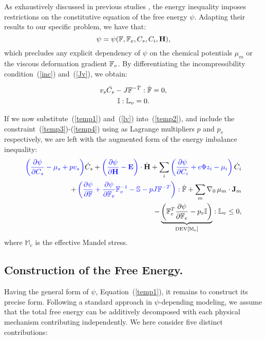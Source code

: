 As exhaustively discussed in previous studies \cite{Plasto,GURTIN}, the energy inequality imposes restrictions on the constitutive equation of the free energy $\psi$. Adapting their results to our specific problem, we have that:
\begin{equation}
\psi = \psi (\mathbb{F},\mathbb{F}_e, C_s, C_i, \mathbf{H}), \label{temp1}
\end{equation}
which precludes any explicit dependency of $\psi$ on the chemical potentials $\mu_m$ or the viscous deformation gradient $\mathbb{F}_v$. By differentiating the incompressibility condition~(\ref{inc}) and~(\ref{Jv}), we obtain:

\begin{gather}
v_s\dot{C_s} - J \mathbb{F}^{-T}:\dot{\mathbb{F}} =0, \label{temp3}\\
\mathbb{I}:\mathbb{L}_v=0. \label{temp4}
\end{gather}

If we now substitute~(\ref{temp1}) and~(\ref{lv}) into~(\ref{temp2}), and include the constraint~(\ref{temp3})-(\ref{temp4}) using as Lagrange multipliers $p$ and $p_v$ respectively, we are left with the augmented form of the energy imbalance inequality:
\begin{equation}
\begin{aligned}
 \color{blue}{\left(\frac{\partial \psi}{\partial C_s}-\mu_s+p v_s\right)}\color{black}\dot{C}_s+\color{blue}\left(\frac{\partial \psi}{\partial \mathbf{H}}-\mathbf{E}\right) \cdot \color{black}\dot{\mathbf{H}}+ \sum_i\color{blue}\left(\frac{\partial \psi}{\partial C_i} + e\Phi z_i-\mu_i\right) \color{black}\dot{C}_i \\
+ \color{blue} \left(\frac{\partial \psi}{\partial \mathbb{F}} + \frac{\partial \psi}{\partial\mathbb{F}_e}\mathbb{F}_v^{-1}- \mathbb{S} - p J \mathbb{F}^{-T}\right): \color{black}\dot{\mathbb{F}}+ \sum_m \nabla_0 \,\mu_m \cdot \mathbf{J}_m \\
- \underbrace{\left(\mathbb{F}_e^T\frac{\partial \psi}{\partial \mathbb{F}_e}-p_v\mathbb{I}\right)}_{\text{DEV}[\mathbb{M}_e]}:\mathbb{L}_v\leq 0 , \label{ineq}
\end{aligned}
\end{equation}
where $\mathbb{M}_e$ is the effective Mandel stress. 
\subsection{Construction of the Free Energy.}
\label{freeenergy}
Having the general form of $\psi$, Equation~(\ref{temp1}), it remains to construct its precise form. Following a standard approach in $\psi$-depending modeling, we assume that the total free energy can be additively decomposed with each physical mechanism contributing independently. We here consider five distinct contributions:

